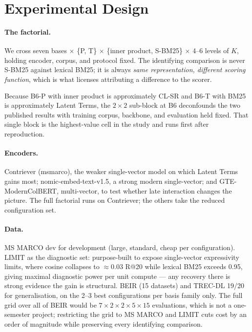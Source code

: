 \documentclass[11pt]{article}
\begin{document}
\section{Experimental Design}

\paragraph{The factorial.} We cross seven bases $\times$ \{P, T\} $\times$ \{inner product, S-BM25\} $\times$ 4--6 levels of $K$, holding encoder, corpus, and protocol fixed. The identifying comparison is never S-BM25 against lexical BM25; it is always \emph{same representation, different scoring function}, which is what licenses attributing a difference to the scorer.

Because B6-P with inner product is approximately CL-SR and B6-T with BM25 is approximately Latent Terms, the $2\times2$ sub-block at B6 deconfounds the two published results with training corpus, backbone, and evaluation held fixed. That single block is the highest-value cell in the study and runs first after reproduction.

\paragraph{Encoders.} Contriever (msmarco), the weaker single-vector model on which Latent Terms gains most; nomic-embed-text-v1.5, a strong modern single-vector; and GTE-ModernColBERT, multi-vector, to test whether late interaction changes the picture. The full factorial runs on Contriever; the others take the reduced configuration set.

\paragraph{Data.} MS MARCO dev for development (large, standard, cheap per configuration). LIMIT \citep{weller2026limit} as the diagnostic set: purpose-built to expose single-vector expressivity limits, where cosine collapses to $\approx$0.03 R@20 while lexical BM25 exceeds 0.95, giving maximal diagnostic power per unit compute --- any recovery there is strong evidence the gain is structural. BEIR (15 datasets) and TREC-DL 19/20 for generalisation, on the 2--3 best configurations per basis family only. The full grid over all of BEIR would be $7\times2\times2\times5\times15$ evaluations, which is not a one-semester project; restricting the grid to MS MARCO and LIMIT cuts cost by an order of magnitude while preserving every identifying comparison.
\end{document}
